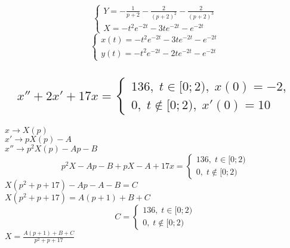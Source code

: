\documentclass{article}
\begin{document}
    \begin{equation*}
    \begin{cases}
        Y = -\frac{1}{p+2} - \frac{2}{(p+2)^2} - \frac{2}{(p+2)^3}\\
        X = -t^2 e^{-2t} - 3te^{-2t} - e^{-2t}
    \end{cases}
    \end{equation*}
    \begin{equation*}
        \begin{cases}
            x(t) = -t^2 e^{-2t} - 3t e^{-2t} - e^{-2t}\\
            y(t) = -t^2 e^{-2t} - 2t e^{-2t} - e^{-2t}
        \end{cases}
    \end{equation*}

    \subsection{
    \begin{equation*}
        x''+2x'+17x=
        \begin{cases}
            136,\; t \in [0; 2), \; x(0) = -2,\\
            0,\; t \notin [0; 2), \; x'(0) = 10
        \end{cases}
    \end{equation*}
    }
    $x \rightarrow X(p)$ \\
    $x' \rightarrow pX(p) - A$ \\
    $x'' \rightarrow p^2 X(p) - Ap -B$ \\
    \begin{equation*}
        p^2X-Ap-B+pX-A+17x =
        \begin{cases}
            136,\; t \in [0; 2)\\
            0,\; t \notin [0; 2)
        \end{cases}
    \end{equation*}
    $X(p^2+p+17) - Ap - A - B = C$ \\
    $X(p^2 + p +17) = A(p+1) + B+C$\\
    \begin{equation*}
        C =
        \begin{cases}
            136,\; t \in [0; 2)\\
            0,\; t \notin [0; 2)
        \end{cases}
    \end{equation*}
    $X = \frac{A(p+1) +B+C}{p^2+p+17}$ \\
\end{document}
